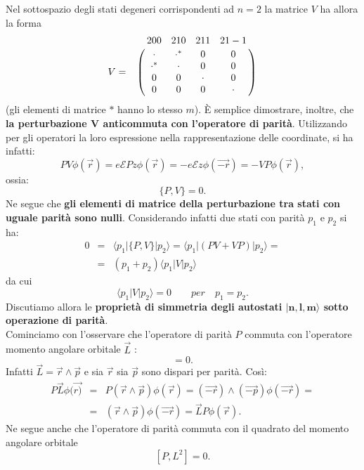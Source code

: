 \documentclass[a4paper,12pt,oneside]{book}
\begin{document}
Nel sottospazio degli stati degeneri corrispondenti ad $n=2$ la matrice $V$ ha allora la forma
\begin{equation} 
V=
\bordermatrix{~&200&210&211&21-1\cr
& \cdot & \cdot^{*} & 0 & 0 \cr
& \cdot^{*} & \cdot & 0 & 0 \cr
& 0 & 0 & \cdot & 0 \cr
& 0 & 0 & 0 & \cdot \cr}
\end{equation}
(gli elementi di matrice $*$ hanno lo stesso $m$).
È semplice dimostrare, inoltre, che \textbf{la perturbazione $\boldsymbol{V}$ anticommuta con l'operatore di parità}. Utilizzando per gli operatori la loro espressione nella rappresentazione delle coordinate, si ha infatti:
\begin{equation}
PV\phi(\vec{r})=e\mathcal{E}Pz\phi(\vec{r})=-e\mathcal{E}z\phi(\vec{-r})=-VP\phi(\vec{r}),
\end{equation}
ossia:
\begin{equation} 
\{P,V\}=0.
\end{equation}
Ne segue che \textbf{gli elementi di matrice della perturbazione tra stati con uguale parità sono nulli}. Considerando infatti due stati con parità $p_1$ e $p_2$ si ha:
\begin{eqnarray}
0 & = &\langle p_1 | \{ P,V \} |p_2\rangle= \langle p_1 | \left( PV+VP \right) |p_2 \rangle = \nonumber \\
 & =& (p_1+p_2)\langle p_1|V|p_2\rangle 
\end{eqnarray}
da cui 
\begin{equation} \label{eq:cap23_2}
\langle p_1| V |p_2\rangle=0 \qquad per \quad p_1=p_2.
\end{equation}
Discutiamo allora le \textbf{proprietà di simmetria degli autostati $\boldsymbol{|n,l,m \rangle}$ sotto operazione di parità}.\\
Cominciamo con l'osservare che l'operatore di parità $P$ commuta con l'operatore momento angolare orbitale $\vec{L}$ :
\begin{equation}
[ P, \vec{L} ]=0.
\end{equation}
Infatti $\vec{L}=\vec{r}\wedge \vec{p}$ e sia $\vec{r}$ sia $\vec{p}$ sono dispari per parità. Così:
\begin{eqnarray}
P\vec{L}\phi(\vec{r)} & = & P(\vec{r}\wedge\vec{p})\phi(\vec{r})= (\vec{-r}) \wedge (\vec{-p})\phi(\vec{-r})= \nonumber \\
& = & (\vec{r} \wedge \vec{p})\phi(\vec{-r})=\vec{L}P\phi(\vec{r}).
\end{eqnarray}
Ne segue anche che l'operatore di parità commuta con il quadrato del momento angolare orbitale
\begin{equation}
\left[ P,L^2\right]=0.
\end{equation}
\end{document}
